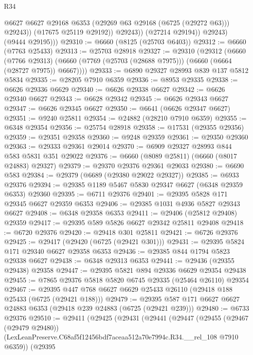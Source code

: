 \begin{lexlean}{R34}
\begin{coremodule}
                      @6627
                      @6627
                      @29168
                      @6353
                      (@29269 @63 @29168 (@6725 (@29272 @63)))
                      @29243))
                  (@17675 @25119 @29192))
                @29243))
            (@27214 @29194))
          @29243)
        (@9444 @29195)))
@29310 := @6660 (@8125 (@25703 @6403))
@29312 := @6660 (@7763 @25433)
@29313 := @25703 @28918
@29327 := @29310
    (@29312
      (@6660
        (@7766 @29313)
        (@6660 (@7769 (@25703 (@28688 @7975))) (@6660 (@6664 (@28727 @7975)) @6667))))
@29333 := @6890 @29327 @28993 @839 @137 @5812 @5834
@29335 := @28205 @7910 @6359
@29336 := @8953 @29335
@29338 := @6626 @29336 @6629
@29340 := @6626 @29338 @6627
@29342 := @6626 @29340 @6627
@29343 := @6628 @29342
@29345 := @6626 @29343 @6627
@29347 := @6626 @29345 @6627
@29350 := @6641 (@6626 @29347 @6627)
@29351 := @9240 @25811
@29354 := @24882 (@28210 @7910 @6359)
@29355 := @6348 @29354
@29356 := @25754 @28918
@29358 := @17531 (@29355 @29356)
@29359 := @29351 @29358
@29360 := @9248 @29359
@29361 := @29350 @29360
@29363 := @29333 @29361 @29014
@29370 := @6909 @29327 @28993 @844 @583 @5831 @351 @29022
@29376 := @6660 (@8089 @25811) (@6660 (@8017 @24883) @29327)
@29379 := @29370 @29376 @29361 @29033
@29380 := @6690 @583
@29384 := @29379 (@6689 (@29380 @29022 @29327))
@29385 := @6933 @29376
@29394 := @29385 @1189 @5467 @5830 @29347 @6627 (@6348 @29359 @6353) @29360
@29395 := @6711 @29376
@29401 := @29395 @5828 @171 @29345 @6627 @29359 @6353
@29406 := @29385 @1031 @4936 @5827 @29343 @6627
@29408 := @6348 @29358 @6353
@29411 := @29406 (@25812 @29408) @29359
@29417 := @29395 @589 @5826 @6627 @29342 @25811 @29408
@29418 := @6720 @29376
@29420 := @29418 @301 @25811
@29421 := @6726 @29376
@29425 := @29417 (@29420 (@6725 (@29421 @301)))
@29431 := @29395 @5824 @171 @29340 @6627 @29358 @6353
@29436 := @29385 @844 @1794 @5823 @29338 @6627
@29438 := @6348 @29313 @6353
@29441 := @29436 (@29355 @29438) @29358
@29447 := @29395 @5821 @894 @29336 @6629 @29354 @29438
@29455 := @7865 @29376 @5818 @5820 @6745 @29335 (@25464 @26110) @29354
@29467 := @29395 @447 @768 @6627 @6629 @25433 @26110 (@29418 @188 @25433 (@6725 (@29421 @188)))
@29479 := @29395 @587 @171 @6627 @6627 @24883 @6353 (@29418 @239 @24883 (@6725 (@29421 @239)))
@29480 := @6733 @29376
@29510 := @29411
    (@29425
      (@29431
        (@29441
          (@29447
            (@29455
              (@29467 (@29479 @29480))
              (LexLeanPreserve.C68af5f12456bdf7aceaa512a70e7994c.R34.__rel_108 @7910 @6359))
            (@29395

\end{coremodule}
\end{lexlean}
